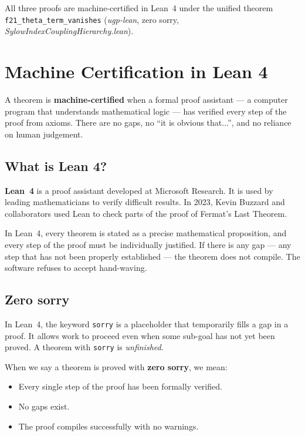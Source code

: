 \documentclass[11pt,a4paper]{article}
\newcommand{\term}[1]{\textbf{#1}}
\newcommand{\lean}[1]{\texttt{#1}}
\begin{document}
All three proofs are machine-certified in Lean~4 under the unified theorem\\[2pt]
\lean{f21\_theta\_term\_vanishes} (\textit{ugp-lean}, zero sorry, \textit{SylowIndexCouplingHierarchy.lean}).

\section{Machine Certification in Lean 4}

\begin{tcolorbox}[colback=boxgreen,colframe=green!50!black,title=What ``machine-certified'' means]
A theorem is \term{machine-certified} when a formal proof assistant --- a computer program that understands mathematical logic --- has verified every step of the proof from axioms.  There are no gaps, no ``it is obvious that...'', and no reliance on human judgement.
\end{tcolorbox}

\subsection{What is Lean 4?}

\term{Lean~4} is a proof assistant developed at Microsoft Research.  It is used by leading mathematicians to verify difficult results.  In 2023, Kevin Buzzard and collaborators used Lean to check parts of the proof of Fermat's Last Theorem.

In Lean~4, every theorem is stated as a precise mathematical proposition, and every step of the proof must be individually justified.  If there is any gap --- any step that has not been properly established --- the theorem does not compile.  The software refuses to accept hand-waving.

\subsection{Zero sorry}

In Lean~4, the keyword \texttt{sorry} is a placeholder that temporarily fills a gap in a proof.  It allows work to proceed even when some sub-goal has not yet been proved.  A theorem with \texttt{sorry} is \emph{unfinished}.

When we say a theorem is proved with \textbf{zero sorry}, we mean:
\begin{itemize}
  \item Every single step of the proof has been formally verified.
  \item No gaps exist.
  \item The proof compiles successfully with no warnings.
\end{itemize}
\end{document}
